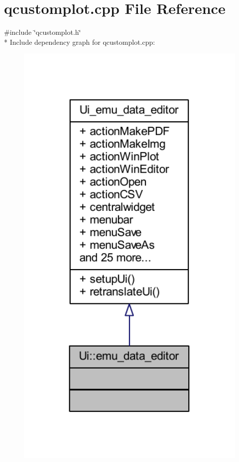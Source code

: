 \hypertarget{a00115}{\section{qcustomplot.\+cpp File Reference}
\label{a00115}
}
{\ttfamily \#include \char`\"{}qcustomplot.\+h\char`\"{}}\\*
Include dependency graph for qcustomplot.\+cpp\+:
\nopagebreak
\begin{figure}[H]
\begin{center}
\leavevmode
\includegraphics[width=350pt]{de/d55/a00323}
\end{center}
\end{figure}
